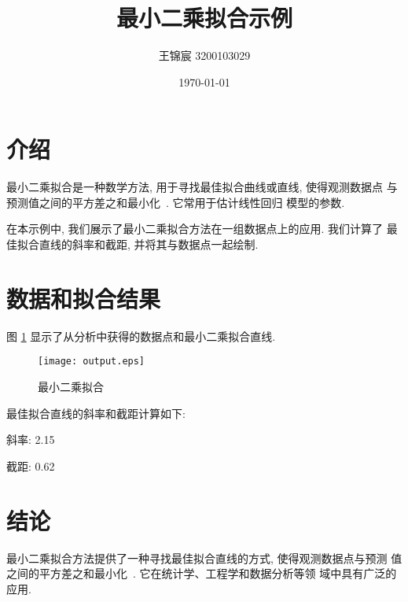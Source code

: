 \documentclass[a4paper]{article}
\begin{document}
\title{最小二乘拟合示例}
\author{王锦宸 3200103029}
\date{\today}
\maketitle

\section{介绍}

最小二乘拟合是一种数学方法, 用于寻找最佳拟合曲线或直线, 使得观测数据点
与预测值之间的平方差之和最小化~\cite{ref1,ref2}. 它常用于估计线性回归
模型的参数.

在本示例中, 我们展示了最小二乘拟合方法在一组数据点上的应用. 我们计算了
最佳拟合直线的斜率和截距, 并将其与数据点一起绘制.

\section{数据和拟合结果}

图 \ref{fig:fitting} 显示了从分析中获得的数据点和最小二乘拟合直线.

\begin{figure}[htbp]
    \centering
    \texttt{[image: output.eps]}
    \caption{最小二乘拟合}
    \label{fig:fitting}
\end{figure}

最佳拟合直线的斜率和截距计算如下:

\noindent 斜率: 2.15

\noindent 截距: 0.62

\section{结论}

最小二乘拟合方法提供了一种寻找最佳拟合直线的方式, 使得观测数据点与预测
值之间的平方差之和最小化~\cite{ref1}. 它在统计学、工程学和数据分析等领
域中具有广泛的应用.



\end{document}
